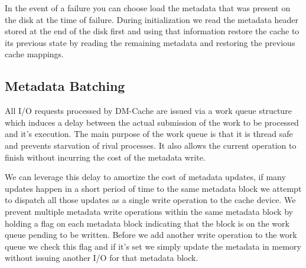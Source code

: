 In the event of a failure you can choose load the metadata that was
present on the disk at the time of failure. During initialization we
read the metadata header stored at the end of the disk first and using
that information restore the cache to its previous state by reading
the remaining metadata and restoring the previous cache mappings.

\subsection{Metadata Batching}

All I/O requests processed by DM-Cache are issued via a work queue
structure which induces a delay between the actual submission of the
work to be processed and it's execution. The main purpose of the work
queue is that it is thread safe and prevents starvation of rival
processes. It also allows the current operation to finish without
incurring the cost of the metadata write.

We can leverage this delay to amortize the cost of metadata updates,
if many updates happen in a short period of time to the same metadata
block we attempt to dispatch all those updates as a single write
operation to the cache device. We prevent multiple metadata write
operations within the same metadata block by holding a flag on each
metadata block indicating that the block is on the work queue pending
to be written. Before we add another write operation to the work queue
we check this flag and if it's set we simply update the metadata in
memory without issuing another I/O for that metadata block.
